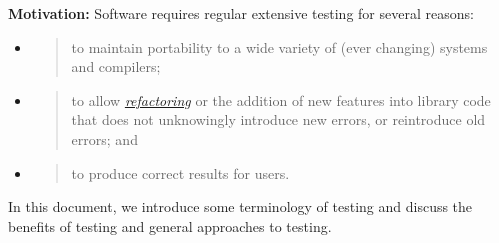 \documentclass[]{article}
\date{}
\begin{document}
\pagestyle{fancy}
\renewcommand{\headrulewidth}{0pt}
  
\thispagestyle{empty}
\textbf{\newline}
\textbf{\newline}
\textbf{\newline}

\textbf{Motivation:} Software requires regular extensive testing for
several reasons:

\begin{itemize}
\item
  \begin{quote}
  to maintain portability to a wide variety of (ever changing) systems
  and compilers;
  \end{quote}
\item
  \begin{quote}
  to allow
  \href{http://www.google.com/url?q=http\%3A\%2F\%2Fen.wikipedia.org\%2Fwiki\%2FCode_refactoring\&sa=D\&sntz=1\&usg=AFQjCNFVmEifSFcA6yNJs7Tp6VS-LwRw4w}{\emph{refactoring}}
  or the addition of new features into library code that does not
  unknowingly introduce new errors, or reintroduce old errors; and
  \end{quote}
\item
  \begin{quote}
  to produce correct results for users.
  \end{quote}
\end{itemize}

In this document, we introduce some terminology of testing and discuss
the benefits of testing and general approaches to testing.
\end{document}
